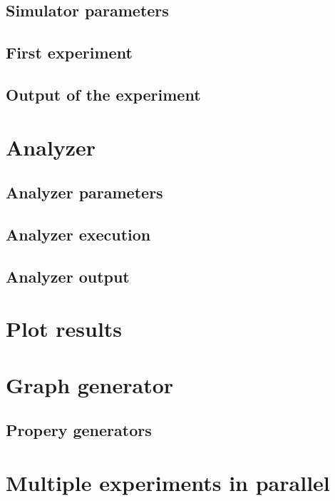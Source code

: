 \documentclass[10pt,journal,onecolumn]{IEEEtran}
\begin{document}
\subsection{Simulator parameters}
\label{subsec:des_param}

\subsection{First experiment}
\label{subsec:first_exp}

\subsection{Output of the experiment}
\label{subsec:des_output}

\section{Analyzer}
\label{sec:analyzer}

\subsection{Analyzer parameters}
\label{subsec:anal_param}

\subsection{Analyzer execution}
\label{subsec:anal_exec}

\subsection{Analyzer output}
\label{subsec:anal_output}

\section{Plot results}
\label{sec:plot_results}

\section{Graph generator}
\label{sec:graph_generator}

\subsection{Propery generators}
\label{sec:graph_propery_generators}

\section{Multiple experiments in parallel}
\label{sec:multiple_experiments}
\end{document}
